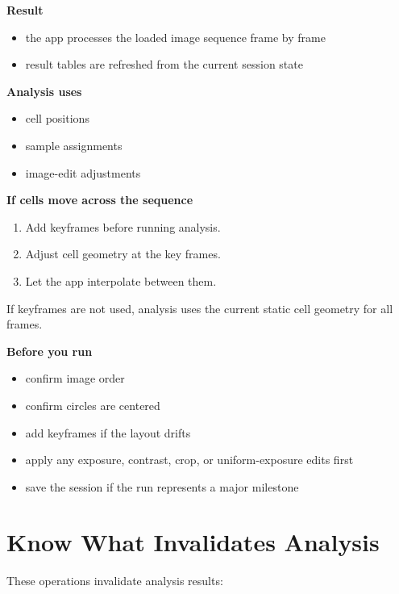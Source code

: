 \documentclass[
  9pt,
  letterpaper,
  oneside,
  open=any,
  DIV=15,
  parskip=half-,
  headings=big,
  numbers=noenddot
]{scrbook}
\newcommand{\manuallead}[1]{%
  \vspace{0.15em}%
  {\sffamily\bfseries\color{ManualBlue}#1}\par\nobreak\vspace{0.05em}%
}
\begin{document}
\manuallead{Result}

\begin{itemize}[leftmargin=*,itemsep=0.35em,topsep=0.4em]
\item the app processes the loaded image sequence frame by frame
\item result tables are refreshed from the current session state
\end{itemize}

\manuallead{Analysis uses}

\begin{itemize}[leftmargin=*,itemsep=0.35em,topsep=0.4em]
\item cell positions
\item sample assignments
\item image-edit adjustments
\end{itemize}

\manuallead{If cells move across the sequence}

\begin{enumerate}[leftmargin=*,itemsep=0.35em,topsep=0.4em]
\item Add keyframes before running analysis.
\item Adjust cell geometry at the key frames.
\item Let the app interpolate between them.
\end{enumerate}

If keyframes are not used, analysis uses the current static cell geometry for all frames.


\manuallead{Before you run}

\begin{itemize}[leftmargin=*,itemsep=0.35em,topsep=0.4em]
\item confirm image order
\item confirm circles are centered
\item add keyframes if the layout drifts
\item apply any exposure, contrast, crop, or uniform-exposure edits first
\item save the session if the run represents a major milestone
\end{itemize}

\section{Know What Invalidates Analysis}

These operations invalidate analysis results:
\end{document}
